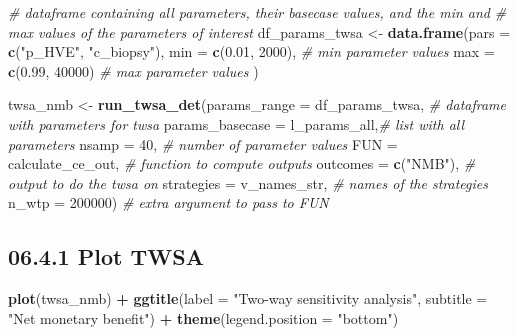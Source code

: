 \documentclass[
]{article}
\newenvironment{Shaded}{\begin{snugshade}}{\end{snugshade}}
\newcommand{\CommentTok}[1]{\textcolor[rgb]{0.56,0.35,0.01}{\textit{#1}}}
\newcommand{\DataTypeTok}[1]{\textcolor[rgb]{0.13,0.29,0.53}{#1}}
\newcommand{\DecValTok}[1]{\textcolor[rgb]{0.00,0.00,0.81}{#1}}
\newcommand{\FloatTok}[1]{\textcolor[rgb]{0.00,0.00,0.81}{#1}}
\newcommand{\KeywordTok}[1]{\textcolor[rgb]{0.13,0.29,0.53}{\textbf{#1}}}
\newcommand{\NormalTok}[1]{#1}
\newcommand{\OperatorTok}[1]{\textcolor[rgb]{0.81,0.36,0.00}{\textbf{#1}}}
\newcommand{\StringTok}[1]{\textcolor[rgb]{0.31,0.60,0.02}{#1}}
\begin{document}
\begin{Shaded}
\begin{Highlighting}[]
\CommentTok{# dataframe containing all parameters, their basecase values, and the min and }
\CommentTok{# max values of the parameters of interest}
\NormalTok{df_params_twsa <-}\StringTok{ }\KeywordTok{data.frame}\NormalTok{(}\DataTypeTok{pars =} \KeywordTok{c}\NormalTok{(}\StringTok{"p_HVE"}\NormalTok{, }\StringTok{"c_biopsy"}\NormalTok{),}
                              \DataTypeTok{min  =} \KeywordTok{c}\NormalTok{(}\FloatTok{0.01}\NormalTok{, }\DecValTok{2000}\NormalTok{), }\CommentTok{# min parameter values}
                              \DataTypeTok{max  =} \KeywordTok{c}\NormalTok{(}\FloatTok{0.99}\NormalTok{, }\DecValTok{40000}\NormalTok{) }\CommentTok{# max parameter values}
\NormalTok{                              )}

\NormalTok{twsa_nmb <-}\StringTok{ }\KeywordTok{run_twsa_det}\NormalTok{(}\DataTypeTok{params_range =}\NormalTok{ df_params_twsa, }\CommentTok{# dataframe with parameters for twsa}
                         \DataTypeTok{params_basecase =}\NormalTok{ l_params_all,}\CommentTok{# list with all parameters}
                         \DataTypeTok{nsamp      =} \DecValTok{40}\NormalTok{,               }\CommentTok{# number of parameter values}
                         \DataTypeTok{FUN        =}\NormalTok{ calculate_ce_out, }\CommentTok{# function to compute outputs}
                         \DataTypeTok{outcomes   =} \KeywordTok{c}\NormalTok{(}\StringTok{"NMB"}\NormalTok{),         }\CommentTok{# output to do the twsa on}
                         \DataTypeTok{strategies =}\NormalTok{ v_names_str,      }\CommentTok{# names of the strategies}
                         \DataTypeTok{n_wtp      =} \DecValTok{200000}\NormalTok{)           }\CommentTok{# extra argument to pass to FUN}
\end{Highlighting}
\end{Shaded}

\hypertarget{plot-twsa}{%
\subsection{06.4.1 Plot TWSA}\label{plot-twsa}}

\begin{Shaded}
\begin{Highlighting}[]
\KeywordTok{plot}\NormalTok{(twsa_nmb) }\OperatorTok{+}\StringTok{ }
\StringTok{  }\KeywordTok{ggtitle}\NormalTok{(}\DataTypeTok{label =} \StringTok{"Two-way sensitivity analysis"}\NormalTok{, }
          \DataTypeTok{subtitle =} \StringTok{"Net monetary benefit"}\NormalTok{) }\OperatorTok{+}
\StringTok{          }\KeywordTok{theme}\NormalTok{(}\DataTypeTok{legend.position =} \StringTok{"bottom"}\NormalTok{)}
\end{Highlighting}
\end{Shaded}
\end{document}
